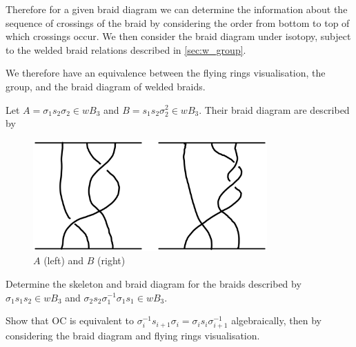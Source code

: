 Therefore for a given braid diagram we can determine the information about the sequence of crossings of the braid by considering the order from bottom to top of which crossings occur. 
We then consider the braid diagram under isotopy, subject to the welded braid relations described in \cref{sec:w_group}. 

We therefore have an equivalence between the flying rings visualisation, the group, and the braid diagram of welded braids. 
\begin{Example}
    Let \( A = \sigma_1 s_2 \sigma_2 \in wB_3 \) and \( B = s_1 s_2 \sigma^2_2 \in wB_3 \). 
    Their braid diagram are described by
    \begin{figure}[H]
        \centering
        \includegraphics[width=0.8\textwidth]{images/welded_braids/2_welded_diagrams_example.png}
        \caption{\( A \) (left) and \( B \) (right)}
    \end{figure}
\end{Example}
\begin{Exercise}
    Determine the skeleton and braid diagram for the braids described by \( \sigma_1 s_1 s_2 \in wB_3 \) and \( \sigma_2 s_2 \sigma^{-1}_1 \sigma_1 s_1 \in wB_3 \).
\end{Exercise}
\begin{Exercise}
    Show that OC is equivalent to \( \sigma_i^{-1} s_{i + 1} \sigma_i = \sigma_i s_i \sigma_{i + 1}^{-1} \) algebraically, then by considering the braid diagram and flying rings visualisation. 
\end{Exercise}
